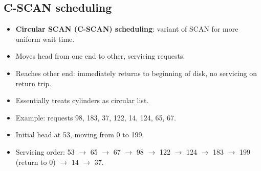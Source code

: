 \subsection{C-SCAN scheduling}
\begin{itemize}
    \item \textbf{Circular SCAN (C-SCAN) scheduling}: variant of SCAN for more uniform wait time.
    \item Moves head from one end to other, servicing requests.
    \item Reaches other end: immediately returns to beginning of disk, no servicing on return trip.
    \item Essentially treats cylinders as circular list.
    \item Example: requests 98, 183, 37, 122, 14, 124, 65, 67.
    \item Initial head at 53, moving from 0 to 199.
    \item Servicing order: 53 $\to$ 65 $\to$ 67 $\to$ 98 $\to$ 122 $\to$ 124 $\to$ 183 $\to$ 199 (return to 0) $\to$ 14 $\to$ 37.
\end{itemize}

